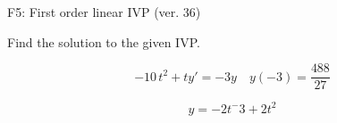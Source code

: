 \begin{exercise}
  \begin{exerciseTitle}F5: First order linear IVP (ver. 36)\end{exerciseTitle}
  \begin{exerciseStatement}
    
Find the solution to the given IVP.

    
\[-10 \, t^{2} +ty'= -3 y \hspace{1em} y( -3 ) = \frac{488}{27}\]

  \end{exerciseStatement}
  \begin{exerciseAnswer}
    
\[y= -2 t^ -3 +2 t^{2}\]

  \end{exerciseAnswer}
\end{exercise}
